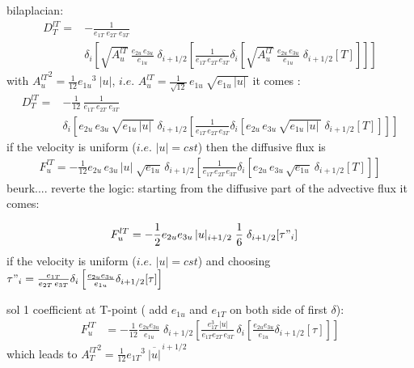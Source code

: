 \documentclass[NEMO_book]{subfiles}
\begin{document}
bilaplacian:
\begin{equation} \label{Eq_tra_ldf_lap}
\begin{split}
D_T^{lT} =&-\frac{1}{e_{1T} \; e_{2T}\;  e_{3T}} \\
& \delta _i \left[  \sqrt{A_u^{lT}}\ \frac{e_{2u}\,e_{3u}}{e_{1u}}\;\delta _{i+1/2} 
		  \left[ \frac{1}{e_{1T}\,e_{2T}\, e_{3T}}
    \delta _i \left[ \sqrt{A_u^{lT}}\ \frac{e_{2u}\,e_{3u}}{e_{1u}}\;\delta _{i+1/2} 
    		  [T] \right] \right] \right]
\end{split}
\end{equation}
with ${A_u^{lT}}^2 = \frac{1}{12} {e_{1u}}^3\ |u|$, 
$i.e.$ $A_u^{lT} = \frac{1}{\sqrt{12}} \,e_{1u}\ \sqrt{ e_{1u}\,|u|\,}$
it comes :
\begin{equation} \label{Eq_tra_ldf_lap}
\begin{split}
D_T^{lT} =&-\frac{1}{12}\,\frac{1}{e_{1T} \; e_{2T}\;  e_{3T}} \\
& \delta _i \left[ e_{2u}\,e_{3u}\,\sqrt{ e_{1u}\,|u|\,}\;\delta _{i+1/2} 
		 \left[ \frac{1}{e_{1T}\,e_{2T}\, e_{3T}} 
    \delta _i \left[ e_{2u}\,e_{3u}\,\sqrt{ e_{1u}\,|u|\,}\;\delta _{i+1/2} 
    		[T] \right] \right] \right]
\end{split}
\end{equation}
if the velocity is uniform ($i.e.$ $|u|=cst$) then the diffusive flux is
\begin{equation} \label{Eq_tra_ldf_lap}
\begin{split}
F_u^{lT} = - \frac{1}{12}
 e_{2u}\,e_{3u}\,|u| \;\sqrt{ e_{1u}}\,\delta _{i+1/2} 
		 \left[ \frac{1}{e_{1T}\,e_{2T}\, e_{3T}} 
    \delta _i \left[ e_{2u}\,e_{3u}\,\sqrt{ e_{1u}}\:\delta _{i+1/2} 
    		[T] \right] \right]
\end{split}
\end{equation}
beurk....  reverte the logic: starting from the diffusive part of the advective flux it comes:

\begin{equation} \label{Eq_tra_adv_ubs2}
\begin{split}
F_u^{lT}
&= - \frac{1}{2} e_{2u} e_{3u}\,|u|_{i+1/2} \;\frac{1}{6} \;\delta_{i+1/2}[\tau"_i]
\end{split}
\end{equation}
if the velocity is uniform ($i.e.$ $|u|=cst$) and choosing $\tau "_i =\frac{e_{1T}}{e_{2T}\,e_{3T}}\delta _i \left[ \frac{e_{2u} e_{3u} }{e_{1u} } \delta _{i+1/2}[\tau] \right]$

sol 1 coefficient at T-point ( add $e_{1u}$ and $e_{1T}$ on both side of first $\delta$):
\begin{equation} \label{Eq_tra_adv_ubs2}
\begin{split}
F_u^{lT}
&= - \frac{1}{12} \frac{e_{2u} e_{3u}}{e_{1u}}\;\delta_{i+1/2}\left[ \frac{e_{1T}^3\,|u|}{e_{1T}e_{2T}\,e_{3T}}\,\delta _i \left[ \frac{e_{2u} e_{3u} }{e_{1u} } \delta _{i+1/2}[\tau] \right] \right]
\end{split}
\end{equation}
which leads to ${A_T^{lT}}^2 = \frac{1}{12} {e_{1T}}^3\ \overline{|u|}^{\,i+1/2}$
\end{document}
